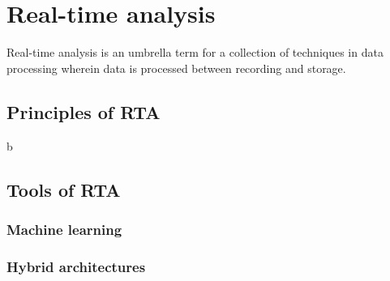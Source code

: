 \section{Real-time analysis}
\label{rta}
Real-time analysis is an umbrella term for a collection of techniques in data processing wherein data is processed between recording and storage.


\subsection{Principles of RTA}
\label{rta-principles}
b

\subsection{Tools of RTA}
\label{rta-tools}

\subsubsection{Machine learning}
\label{machine-learning}

\subsubsection{Hybrid architectures}
\label{hybrid-architectures}